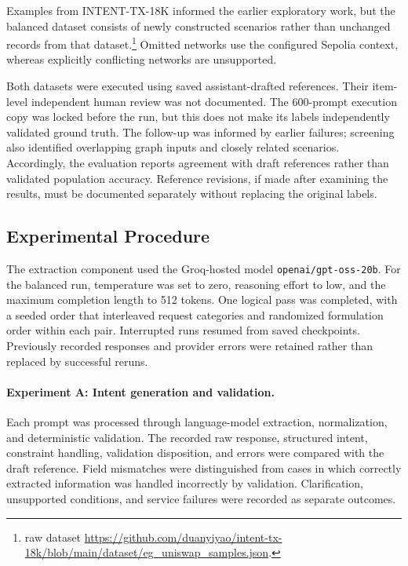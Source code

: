 Examples from INTENT-TX-18K informed the earlier exploratory work,
but the balanced dataset consists of newly constructed scenarios
rather than unchanged records from that dataset.\footnote{raw dataset
\url{https://github.com/duanyiyao/intent-tx-18k/blob/main/dataset/eg_uniswap_samples.json}.}
Omitted networks use the configured Sepolia context, whereas
explicitly conflicting networks are unsupported.

Both datasets were executed using saved assistant-drafted references. Their
item-level independent human review was not documented. The 600-prompt
execution copy was locked before the run, but this does not make its labels
independently validated ground truth. The follow-up was informed by earlier
failures; screening also identified overlapping graph inputs and closely
related scenarios. Accordingly, the evaluation reports agreement with draft
references rather than validated population accuracy. Reference revisions,
if made after examining the results, must be documented separately without
replacing the original labels.

\subsection{Experimental Procedure}
\label{sec:evaluation_procedure}

The extraction component used the Groq-hosted model
\texttt{openai/gpt-oss-20b}. For the balanced run, temperature was set to zero,
reasoning effort to low, and the maximum completion length to 512 tokens.
One logical pass was completed, with a seeded order that interleaved request
categories and randomized formulation order within each pair. Interrupted
runs resumed from saved checkpoints. Previously recorded responses and
provider errors were retained rather than replaced by successful reruns.

\paragraph{Experiment A: Intent generation and validation.}
Each prompt was processed through language-model extraction, normalization,
and deterministic validation. The recorded raw response, structured intent,
constraint handling, validation disposition, and errors were compared with
the draft reference. Field mismatches were distinguished from cases in which
correctly extracted information was handled incorrectly by validation.
Clarification, unsupported conditions, and service failures were recorded as
separate outcomes.

